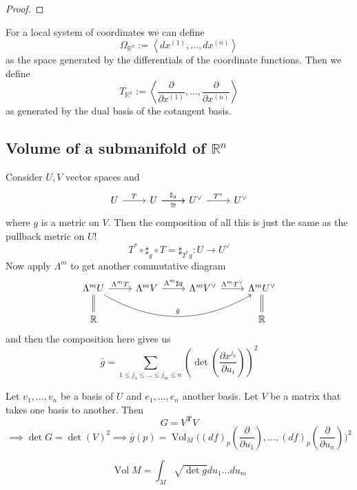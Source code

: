\begin{proof}\leavevmode
\end{proof}

\begin{defn}\leavevmode
For a local system of coordinates we can define
\[\Omega_{\mathbb{R}^n}:=\left<dx^{(1)},\ldots,dx^{(n)}\right>\]
as the space generated by the differentials of the coordinate functions. Then we define
\[T_{\mathbb{R}^n}:=\left<\frac{\partial }{\partial x^{(1)}},\ldots,\frac{\partial }{\partial x^{(n)}}\right>\]
as generated by the dual basis of the cotangent basis.
\end{defn}

\subsection{Volume of a submanifold of \(\mathbb{R}^n\)}

Consider \(U,V\) vector spaces and
\[\begin{tikzcd}
	U \arrow[r,"T"]& U \arrow[ r,"\sharp_g"]\arrow[r,"\cong",swap]&  U^{\vee}\arrow[r,"T^*"]&  U^{\vee}
\end{tikzcd}\]
where \(g\) is a metric on \(V\). Then the composition of all this is just the same as the pullback metric on \(U\)! 
\[T^*  \circ \sharp_g \circ T=\sharp_{T^*g}:U \to U^{\vee}\]
Now apply \(\Lambda^{m}\) to get another commutative diagram
\[\begin{tikzcd}
	\Lambda^{m}U \arrow[ r,"\Lambda^{m}T"]\arrow[rrr,bend right,"\bar{g}"]\arrow[d,equals]&\Lambda^{m}V\arrow[r,"\Lambda^{m}\sharp g"]&\Lambda^{m}V^{\vee}\arrow[ r,"\Lambda^{m}T^{\vee}"]&  \Lambda^{m}U^{\vee}\arrow[d,equals]\\
	\mathbb{R}& & & \mathbb{R}
\end{tikzcd}\]
and then the composition here gives us
\[\bar{g}=\sum_{1\leq  j_1\leq \ldots \leq j_m \leq n}\left(\det\left(\frac{\partial x^{j_k}}{\partial u_i}\right) \right) ^2\]

Let \(v_1,\ldots,v_n\) be a basis of \(U\) and \(e_1,\ldots,e_n\) another basis. Let \(V\) be a matrix that takes one basis to another. Then
\[G=V^{\mathbf{T}}V\]
\[\implies \det G= \det(V)^2\implies \bar{g}(p)=\operatorname{Vol}_M\Big((df)_p\left(\frac{\partial }{\partial u_1}\right),\ldots,(df)_p\left(\frac{\partial }{\partial u_n}\right) \Big)^2 \]

\begin{defn}\leavevmode
 \[\operatorname{Vol}M=\int_M\sqrt{\det g}du_1\ldots du_m \]
\end{defn}

